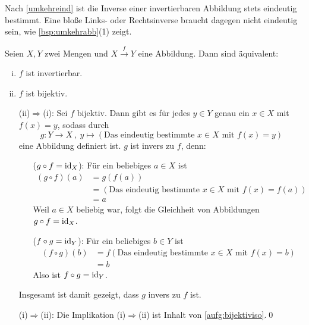 \begin{bem}
    Nach \cref{umkehreind} ist die Inverse einer invertierbaren Abbildung stets eindeutig bestimmt. Eine bloße Links- oder Rechtsinverse braucht dagegen nicht eindeutig sein, wie \cref{bsp:umkehrabb}(1) zeigt.
\end{bem}


\begin{satz} \label{bijektiviso}
    Seien $X,Y$ zwei Mengen und $X\xrightarrow{f} Y$ eine Abbildung. Dann sind äquivalent:
    \begin{enumerate}[(i)]
        \item $f$ ist invertierbar.
        \item $f$ ist bijektiv.
    \end{enumerate}
\end{satz}


\begin{bew}\quad
    \begin{enumerate}
        \item[(ii)$\Rightarrow$(i):] Sei $f$ bijektiv. Dann gibt es für jedes $y\in Y$ genau ein $x\in X$ mit $f(x)=y$, sodass durch
            \[ g : Y\to X \ ,\ y \mapsto (\text{Das eindeutig bestimmte $x\in X$ mit $f(x)=y$}) \]
        eine Abbildung definiert ist. $g$ ist invers zu $f$, denn:
        \begin{enumerate}
            \item[($g\circ f=\mathrm{id}_X$):] Für ein beliebiges $a\in X$ ist
            \begin{align*}
                (g\circ f)(a) & = g(f(a)) \\
                & = (\text{Das eindeutig bestimmte $x\in X$ mit $f(x)=f(a)$}) \\
                & = a
            \end{align*}
            Weil $a\in X$ beliebig war, folgt die Gleichheit von Abbildungen $g\circ f=\mathrm{id}_X$.
            \item[($f\circ g=\mathrm{id}_Y$):] Für ein beliebiges $b\in Y$ ist
            \begin{align*}
                (f\circ g)(b) & = f(\text{Das eindeutig bestimmte $x\in X$ mit $f(x)=b$}) \\
                & = b
            \end{align*}
            Also ist $f\circ g=\mathrm{id}_Y$. 
        \end{enumerate}
        Insgesamt ist damit gezeigt, dass $g$ invers zu $f$ ist.
        \item[(i)$\Rightarrow$(ii):] Die Implikation (i)$\Rightarrow$(ii) ist Inhalt von \cref{aufg:bijektiviso}.\qed
    \end{enumerate}
\end{bew}


